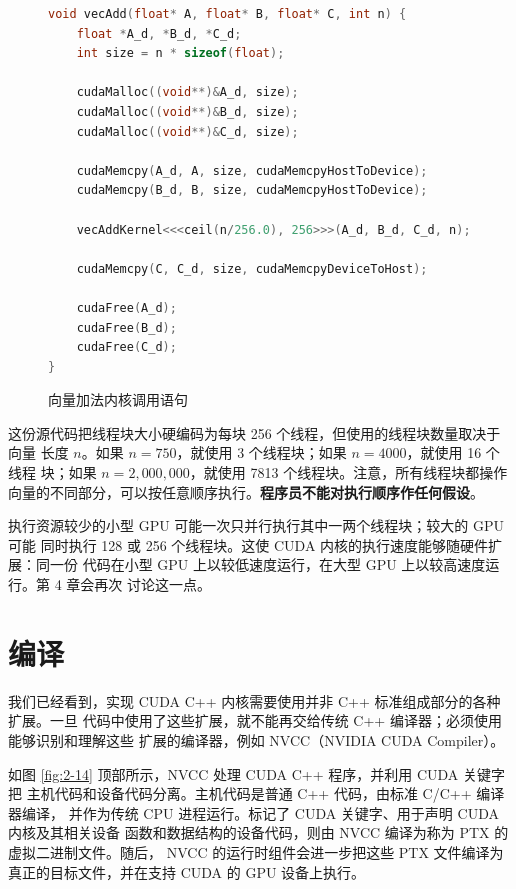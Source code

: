 \begin{figure}[htbp]
  \centering
  \begin{lstlisting}[language=C++]
void vecAdd(float* A, float* B, float* C, int n) {
    float *A_d, *B_d, *C_d;
    int size = n * sizeof(float);

    cudaMalloc((void**)&A_d, size);
    cudaMalloc((void**)&B_d, size);
    cudaMalloc((void**)&C_d, size);

    cudaMemcpy(A_d, A, size, cudaMemcpyHostToDevice);
    cudaMemcpy(B_d, B, size, cudaMemcpyHostToDevice);

    vecAddKernel<<<ceil(n/256.0), 256>>>(A_d, B_d, C_d, n);

    cudaMemcpy(C, C_d, size, cudaMemcpyDeviceToHost);

    cudaFree(A_d);
    cudaFree(B_d);
    cudaFree(C_d);
}
  \end{lstlisting}
  \caption{向量加法内核调用语句}
  \label{fig:2-13}
\end{figure}

这份源代码把线程块大小硬编码为每块 256 个线程，但使用的线程块数量取决于向量
长度 $n$。如果 $n=750$，就使用 3 个线程块；如果 $n=4000$，就使用 16 个线程
块；如果 $n=2{,}000{,}000$，就使用 7813 个线程块。注意，所有线程块都操作
向量的不同部分，可以按任意顺序执行。\textbf{程序员不能对执行顺序作任何假设}。

执行资源较少的小型 GPU 可能一次只并行执行其中一两个线程块；较大的 GPU 可能
同时执行 128 或 256 个线程块。这使 CUDA 内核的执行速度能够随硬件扩展：同一份
代码在小型 GPU 上以较低速度运行，在大型 GPU 上以较高速度运行。第 4 章会再次
讨论这一点。

\section{编译}
\label{sec:compilation}

我们已经看到，实现 CUDA C++ 内核需要使用并非 C++ 标准组成部分的各种扩展。一旦
代码中使用了这些扩展，就不能再交给传统 C++ 编译器；必须使用能够识别和理解这些
扩展的编译器，例如 NVCC（NVIDIA CUDA Compiler）。

如图 \ref{fig:2-14} 顶部所示，NVCC 处理 CUDA C++ 程序，并利用 CUDA 关键字把
主机代码和设备代码分离。主机代码是普通 C++ 代码，由标准 C/C++ 编译器编译，
并作为传统 CPU 进程运行。标记了 CUDA 关键字、用于声明 CUDA 内核及其相关设备
函数和数据结构的设备代码，则由 NVCC 编译为称为 PTX 的虚拟二进制文件。随后，
NVCC 的运行时组件会进一步把这些 PTX 文件编译为真正的目标文件，并在支持 CUDA
的 GPU 设备上执行。

